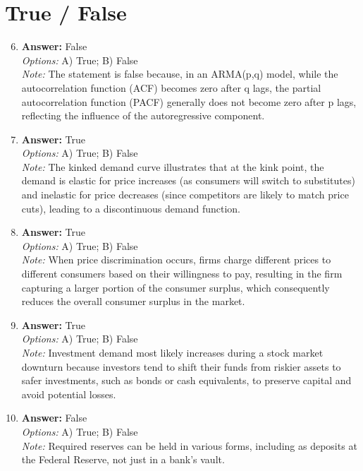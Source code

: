 \documentclass[12pt]{article}
\begin{document}
\section*{True / False}
\begin{enumerate}[label=\arabic*.]
\setcounter{enumi}{5}
\item \textbf{Answer:} False
\\ \textit{Options:} A) True; B) False
\\ \textit{Note:} The statement is false because, in an ARMA(p,q) model, while the autocorrelation function (ACF) becomes zero after q lags, the partial autocorrelation function (PACF) generally does not become zero after p lags, reflecting the influence of the autoregressive component.
\item \textbf{Answer:} True
\\ \textit{Options:} A) True; B) False
\\ \textit{Note:} The kinked demand curve illustrates that at the kink point, the demand is elastic for price increases (as consumers will switch to substitutes) and inelastic for price decreases (since competitors are likely to match price cuts), leading to a discontinuous demand function.
\item \textbf{Answer:} True
\\ \textit{Options:} A) True; B) False
\\ \textit{Note:} When price discrimination occurs, firms charge different prices to different consumers based on their willingness to pay, resulting in the firm capturing a larger portion of the consumer surplus, which consequently reduces the overall consumer surplus in the market.
\item \textbf{Answer:} True
\\ \textit{Options:} A) True; B) False
\\ \textit{Note:} Investment demand most likely increases during a stock market downturn because investors tend to shift their funds from riskier assets to safer investments, such as bonds or cash equivalents, to preserve capital and avoid potential losses.
\item \textbf{Answer:} False
\\ \textit{Options:} A) True; B) False
\\ \textit{Note:} Required reserves can be held in various forms, including as deposits at the Federal Reserve, not just in a bank's vault.
\end{enumerate}
\end{document}
